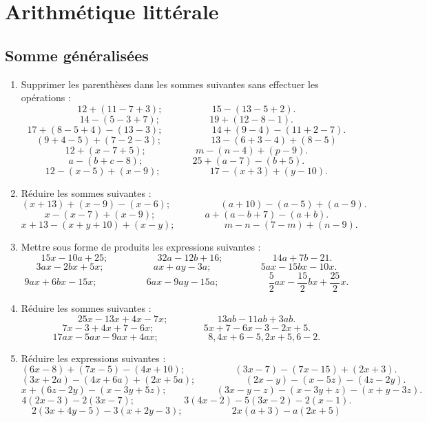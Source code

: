 \documentclass[12 pt]{report}
\theoremstyle{plain}
\newcounter{n}
\begin{document}
 \part{Arithmétique littérale}
 
 \chapter{Somme généralisées}
 \begin{enumerate}
 \item Supprimer les parenthèses dans les sommes suivantes sans effectuer les opérations : 
 \[ 12 + (11 - 7 + 3) ; \phantom{meowmeow} 15 - (13 - 5 + 2).\]
 \[ 14 - ( 5 - 3 + 7); \phantom{meowmeow} 19 + (12 - 8 - 1). \]
 \[ 17 + ( 8 - 5 + 4) - (13 -3); \phantom{meowmeow} 14 + (9 - 4) - (11 + 2 - 7).\]
 \[(9 + 4 - 5) + (7 - 2 - 3); \phantom{meowmeow} 13 - (6 + 3 - 4) + ( 8 - 5)\]
 \[ 12 + ( x - 7 + 5); \phantom{meowmeow} m - (n - 4) + (p - 9).\]
 \[ a - (b + c - 8); \phantom{meowmeow} 25 + (a - 7)  - (b + 5).\]
 \[ 12 - (x - 5) + (x - 9); \phantom{meowmeow} 17 - (x + 3) + (y - 10).\]
 \item Réduire les sommes suivantes : 
 \[ (x + 13) + (x - 9) - (x - 6); \phantom{meowmeow} 
 (a + 10) - (a - 5) + (a - 9). \]
 \[ x - (x - 7)  + (x - 9); \phantom{meowmeow} 
 a + (a - b + 7) - (a + b). \]
 \[ x + 13 - (x + y + 10) + (x - y); \phantom{meowmeow} 
 m - n - (7 - m) + (n - 9).\]
 \item Mettre sous forme de produits les expressions suivantes : 
\[ 15 x -10 a + 25; \phantom{meowmeow} 32 a - 12 b + 16; \phantom{meowmeow}
14a + 7b - 21.\]
\[ 3ax-2bx + 5x; \phantom{meowmeow} ax + ay - 3a; \phantom{meowmeow}
5ax - 15 bx - 10x.\]
\[ 9ax + 6bx - 15x; \phantom{meowmeow} 6ax - 9ay - 15 a; \phantom{meowmeow}
\frac52 ax - \frac{15}2bx + \frac{25}2 x. \]
\item Réduire les sommes suivantes : 
\[25x - 13 x + 4x - 7x; \phantom{meowmeow} 13 ab - 11 ab + 3ab. \]
\[ 7x - 3 + 4x +7 - 6x; \phantom{meowmeow} 5x + 7 - 6x - 3 - 2x + 5.\]
\[ 17 ax - 5ax - 9ax + 4ax ; \phantom{meowmeow} 8,4x + 6 - 5,2x + 5,6 - 2.\]
\item Réduire les expressions suivantes : 
\[ (6x - 8) + (7x - 5) - (4x + 10); \phantom{meowmeow} (3x -7) - (7x - 15)
+ (2x + 3).\]
\[ (3x + 2a) - (4x + 6a) + (2x + 5a); \phantom{meowmeow} (2x - y) - (x - 5z)
- (4z - 2y). \]
\[ x + (6z - 2y) - (x - 3y + 5z); \phantom{meowmeow} (3x - y - z) - (x - 3y + z) - (x + y - 3z).\]
\[ 4(2x - 3) - 2(3x - 7); \phantom{meowmeow} 3(4x - 2)- 5(3x - 2) - 2(x -1).\]
\[2(3x + 4y - 5) - 3(x + 2y - 3) ; \phantom{meowmeow} 2x(a + 3) - a(2x +  5)
\]
\end{enumerate}
\end{document}
